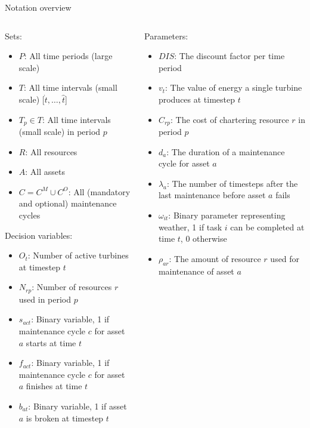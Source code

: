 \documentclass{beamer}
\begin{document}
\begin{frame}{Notation overview}
\tiny

\begin{columns}
\begin{column}{.48\textwidth}
Sets:
\begin{itemize}
\item $P$: All time periods (large scale)
\item $T$: All time intervals (small scale) [$\dot{t}, \dots , \hat{t}$]
\item $T_p \in T$: All time intervals (small scale) in period $p$
\item $R$: All resources
\item $A$: All assets
\item $C = C^M \cup C^O$: All (mandatory and optional) maintenance cycles
\end{itemize}

Decision variables:
\begin{itemize}
\item $O_{t}$: Number of active turbines at timestep $t$
\item $N_{rp}$: Number of resources $r$ used in period $p$
\item $s_{act}$: Binary variable, 1 if maintenance cycle $c$ for asset $a$ starts at time $t$
\item $f_{act}$: Binary variable, 1 if maintenance cycle $c$ for asset $a$ finishes at time $t$
\item $b_{at}$: Binary variable, 1 if asset $a$ is broken at timestep $t$
\end{itemize}
\end{column}

\hfill

\begin{column}{.48\textwidth}
Parameters:
\begin{itemize}
\item $DIS$: The discount factor per time period
\item $v_t$: The value of energy a single turbine produces at timestep $t$
\item $C_{rp}$: The cost of chartering resource $r$ in period $p$
\item $d_a$: The duration of a maintenance cycle for asset $a$
\item $\lambda_a$: The number of timesteps after the last maintenance before asset $a$ fails
\item $\omega_{it}$: Binary parameter representing weather, 1 if task $i$ can be completed at time $t$, 0 otherwise
\item $\rho_{ar}$: The amount of resource $r$ used for maintenance of asset $a$
\end{itemize}
\end{column}
\end{columns}

\end{frame}
\end{document}
